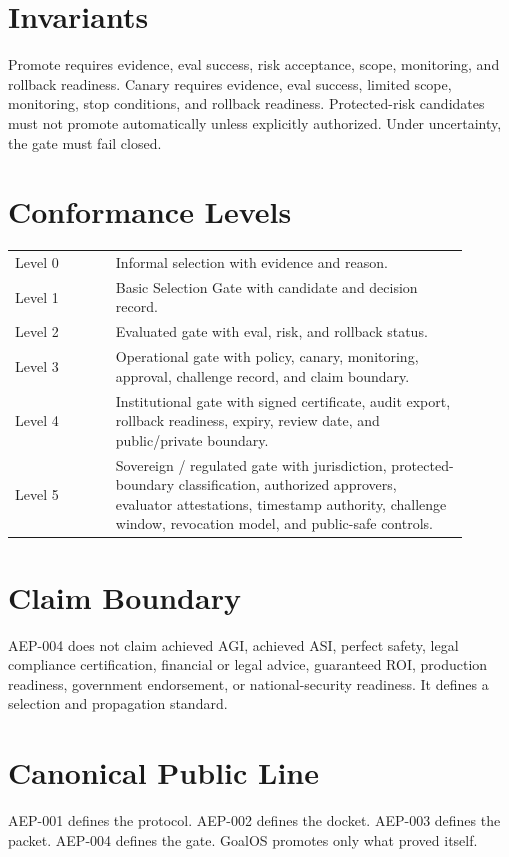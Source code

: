 \documentclass[11pt]{article}
\begin{document}
\section{Invariants}
Promote requires evidence, eval success, risk acceptance, scope, monitoring, and rollback readiness. Canary requires evidence, eval success, limited scope, monitoring, stop conditions, and rollback readiness. Protected-risk candidates must not promote automatically unless explicitly authorized. Under uncertainty, the gate must fail closed.

\section{Conformance Levels}
\begin{longtable}{p{0.20\linewidth}p{0.70\linewidth}}
Level 0 & Informal selection with evidence and reason.\\
Level 1 & Basic Selection Gate with candidate and decision record.\\
Level 2 & Evaluated gate with eval, risk, and rollback status.\\
Level 3 & Operational gate with policy, canary, monitoring, approval, challenge record, and claim boundary.\\
Level 4 & Institutional gate with signed certificate, audit export, rollback readiness, expiry, review date, and public/private boundary.\\
Level 5 & Sovereign / regulated gate with jurisdiction, protected-boundary classification, authorized approvers, evaluator attestations, timestamp authority, challenge window, revocation model, and public-safe controls.\\
\end{longtable}

\section{Claim Boundary}
AEP-004 does not claim achieved AGI, achieved ASI, perfect safety, legal compliance certification, financial or legal advice, guaranteed ROI, production readiness, government endorsement, or national-security readiness. It defines a selection and propagation standard.

\section*{Canonical Public Line}
AEP-001 defines the protocol. AEP-002 defines the docket. AEP-003 defines the packet. AEP-004 defines the gate. GoalOS promotes only what proved itself.
\end{document}
